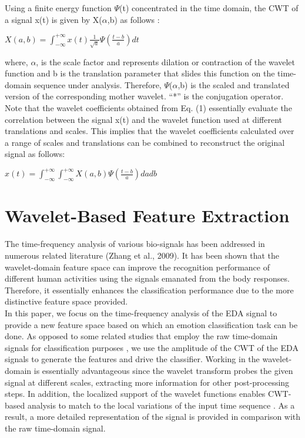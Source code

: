 Using a finite energy function $\Psi$(t) concentrated in the time domain, the CWT of 
a signal x(t) is given by X($\alpha$,b) as follows \cite{WaveletFilter1992}:

$X(a,b) = \int_{-\infty}^{+\infty}x(t)\frac{1}{\sqrt{a}} \Psi (\frac{t-b}{a}) dt$\newline

where, $\alpha$, is the scale factor and represents dilation or contraction of the wavelet 
function and b is the translation parameter that slides this function on the 
time-domain sequence under analysis. Therefore, $\Psi$($\alpha$,b) is the scaled and translated 
version of the corresponding mother wavelet. “*” is the conjugation operator.\\

Note that the wavelet coefficients obtained from Eq. (1) essentially evaluate the 
correlation between the signal x(t) and the wavelet function used at different 
translations and scales. This implies that the wavelet coefficients calculated 
over a range of scales and translations can be combined to reconstruct the original 
signal as follows:

$x(t) = \int_{-\infty}^{+\infty} \int_{-\infty}^{+\infty} X(a,b) \Psi (\frac{t-b}{a}) dadb$\newline

\section{Wavelet-Based Feature Extraction}
The time-frequency analysis of various bio-signals has been addressed in numerous 
related literature \cite{MultKernel2016, FFTSync2017}(Zhang et al., 2009). 
It has been shown that the wavelet-domain feature space can improve the recognition 
performance of different human activities using the signals emanated from the body 
responses. Therefore, it essentially enhances the classification performance due to 
the more distinctive feature space provided. \\

In this paper, we focus on the time-frequency analysis of the EDA signal to provide 
a new feature space based on which an emotion classification task can be done. As 
opposed to some related studies that employ the raw time-domain signals for 
classification purposes \cite{ArousalValence2017, EmotionClass2012}, we use the 
amplitude of the CWT of the EDA signals to generate the features and drive the 
classifier. Working in the wavelet-domain is essentially advantageous since the 
wavelet transform probes the given signal at different scales, extracting more 
information for other post-processing steps. In addition, the localized support 
of the wavelet functions enables CWT-based analysis to match to the local variations 
of the input time sequence \cite{WaveletFilter1992}. As a result, a more detailed 
representation of the signal is provided in comparison with the raw time-domain signal.\\


